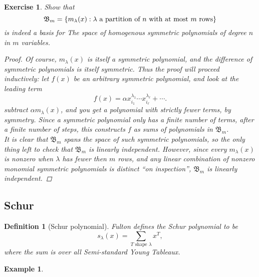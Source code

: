\documentclass{article}
\let\originalleft\left
\let\originalright\right
\renewcommand{\left}{\mathopen{}\mathclose\bgroup\originalleft}
\renewcommand{\right}{\aftergroup\egroup\originalright}
\newcommand{\set}[1]{\left\{#1\right\}}
\newtheorem{definition}[theo]{Definition}
\newtheorem{example}[theo]{Example}
\newtheorem{exercise}[theo]{Exercise}
\begin{document}
\begin{exercise}
  Show that \[
    \mathfrak{B}_m = \set{m_\lambda(x) : \lambda \text{ a partition of } n \text{ with at most } m \text{ rows} }
  \] is indeed a basis for The space of homogenous symmetric polynomials of
  degree $n$ in $m$ variables.
  \begin{proof}
    Of course, $m_\lambda(x)$ is itself a symmetric polynomial, and the
    difference of symmetric polynomials is itself symmetric. Thus the proof
    will proceed inductively: let $f(x)$ be an arbitrary symmetric polynomial,
    and look at the leading term \[
      f(x) = \alpha x_{i_1}^{\lambda_1}\cdots x_{i_\ell}^{\lambda_\ell} + \cdots.
    \] subtract $\alpha m_\lambda(x)$, and you get a polynomial with strictly
    fewer terms, by symmetry. Since a symmetric polynomial only has a finite
    number of terms, after a finite number of steps, this constructs $f$ as sums of polynomials in $\mathfrak{B}_m$.
    \\
    It is clear that $\mathfrak{B}_m$ spans the space of such symmetric
    polynomials, so the only thing left to check that $\mathfrak{B}_m$ is
    linearly independent. However, since every $m_\lambda(x)$ is nonzero when
    $\lambda$ has fewer then $m$ rows, and any linear combination of nonzero
    monomial symmetric polynomials is distinct ``on inspection'',
    $\mathfrak{B}_m$ is linearly independent.
  \end{proof}
\end{exercise}
\subsection{Schur}
\begin{definition}[Schur polynomial]
  Fulton defines the Schur polynomial to be \[
    s_\lambda(x) = \sum_{T \text{ shape }\lambda} x^T,
  \] where the sum is over all Semi-standard Young Tableaux.
\end{definition}
\begin{example}
  
\end{example}
\end{document}
